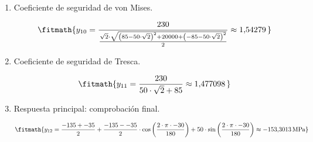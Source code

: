 \begin{enumerate}
\[\fitmath{y_{9}=-\left(\frac{-135--35}{2}\right)\cdot \sin\left(\frac{2\cdot \pi\cdot -30}{180}\right)+50\cdot \cos\left(\frac{2\cdot \pi\cdot -30}{180}\right)\approx -18{,}30127\,\mathrm{MPa}}\]

\item Coeficiente de seguridad de von Mises.

\[\fitmath{y_{10}=\frac{230}{\frac{\sqrt{2}\cdot \sqrt{{\left(85-50\cdot \sqrt{2}\right)}^{2}+20000+{\left(-85-50\cdot \sqrt{2}\right)}^{2}}}{2}}\approx 1{,}54279\,}\]

\item Coeficiente de seguridad de Tresca.

\[\fitmath{y_{11}=\frac{230}{50\cdot \sqrt{2}+85}\approx 1{,}477098\,}\]

\item Respuesta principal: comprobación final.

\[\fitmath{y_{12}=\frac{-135+-35}{2}+\frac{-135--35}{2}\cdot \cos\left(\frac{2\cdot \pi\cdot -30}{180}\right)+50\cdot \sin\left(\frac{2\cdot \pi\cdot -30}{180}\right)\approx -153{,}3013\,\mathrm{MPa}}\]

\end{enumerate}
